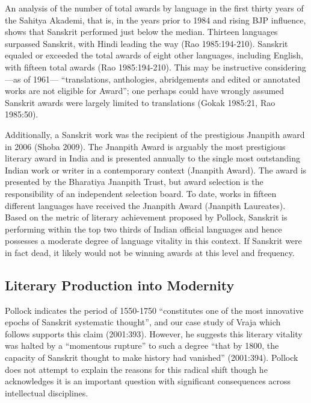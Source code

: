 An analysis of the number of total awards by language in the first thirty years of the Sahitya Akademi, that is, in the years prior to 1984 and rising BJP influence, shows that Sanskrit performed just below the median. Thirteen languages surpassed Sanskrit, with Hindi leading the way (Rao 1985:194-210). Sanskrit equaled or exceeded the total awards of eight other languages, including English, with fifteen total awards (Rao 1985:194-210). This may be instructive considering—as of 1961— “translations, anthologies, abridgements and edited or annotated works are not eligible for Award”; one perhaps could have wrongly assumed Sanskrit awards were largely limited to translations (Gokak 1985:21, Rao 1985:50). 

Additionally, a Sanskrit work was the recipient of the prestigious Jnanpith award in 2006 (Shoba 2009). The Jnanpith Award is arguably the most prestigious literary award in India and is presented annually to the single most outstanding Indian work or writer in a contemporary context (Jnanpith Award). The award is presented by the Bharatiya Jnanpith Trust, but award selection is the responsibility of an independent selection board. To date, works in fifteen different languages have received the Jnanpith Award (Jnanpith Laureates). Based on the metric of literary achievement proposed by Pollock, Sanskrit is performing within the top two thirds of Indian official languages and hence possesses a moderate degree of language vitality in this context. If Sanskrit were in fact dead, it likely would not be winning awards at this level and frequency. 
\vskip -20pt

\subsection*{Literary Production into Modernity}
\vskip -4pt

Pollock indicates the period of 1550-1750 “constitutes one of the most innovative epochs of Sanskrit systematic thought”, and our case study of Vraja which follows supports this claim (2001:393). However, he suggests this literary vitality was halted by a “momentous rupture” to such a degree “that by 1800, the capacity of Sanskrit thought to make history had vanished” (2001:394). Pollock does not attempt to explain the reasons for this radical shift though he acknowledges it is an important question with significant consequences across intellectual disciplines. 

